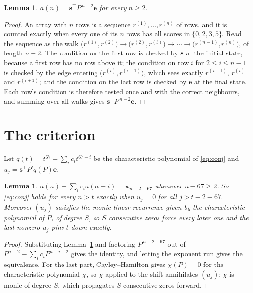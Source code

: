 \documentclass[11pt,a4paper]{article}
\theoremstyle{plain}
\newtheorem{lemma}[theorem]{Lemma}
\theoremstyle{definition}
\begin{document}
\begin{lemma}\label{lem:walk}
$a(n)=\mathbf{s}^{\!\top}P^{\,n-2}\mathbf{e}$ for every $n\ge2$.
\end{lemma}

\begin{proof}
An array with $n$ rows is a sequence $r^{(1)},\dots,r^{(n)}$ of rows, and it is counted
exactly when every one of its $n$ rows has all scores in $\{0,2,3,5\}$. Read the sequence as the
walk $\bigl(r^{(1)},r^{(2)}\bigr)\to\bigl(r^{(2)},r^{(3)}\bigr)\to\cdots\to
\bigl(r^{(n-1)},r^{(n)}\bigr)$, of length $n-2$. The condition on the first row is
checked by $\mathbf{s}$ at the initial state, because a first row has no row above it; the
condition on row $i$ for $2\le i\le n-1$ is checked by the edge entering
$\bigl(r^{(i)},r^{(i+1)}\bigr)$, which sees exactly $r^{(i-1)}$, $r^{(i)}$ and
$r^{(i+1)}$; and the condition on the last row is checked by $\mathbf{e}$ at the final
state. Each row's condition is therefore tested once and with the correct neighbours, and
summing over all walks gives $\mathbf{s}^{\!\top}P^{\,n-2}\mathbf{e}$.
\end{proof}

\section{The criterion}

Let $q(t)=t^{67}-\sum_i c_i t^{67-i}$ be the characteristic polynomial of
\eqref{eq:conj} and $u_j=\mathbf{s}^{\!\top}P^{j}q(P)\mathbf{e}$.

\begin{lemma}\label{lem:crit}
$a(n)-\sum_i c_i a(n-i)=u_{\,n-2-67}$ whenever $n-67\ge2$. So \eqref{eq:conj}
holds for every $n>t$ exactly when $u_j=0$ for all $j>t-2-67$. Moreover $(u_j)$
satisfies the monic linear recurrence given by the characteristic polynomial of $P$, of
degree $S$, so $S$ consecutive zeros force every later one and the last nonzero $u_j$ pins
$t$ down exactly.
\end{lemma}

\begin{proof}
Substituting Lemma~\ref{lem:walk} and factoring $P^{\,n-2-67}$ out of
$P^{n-2}-\sum_i c_i P^{n-i-2}$ gives the identity, and letting the exponent run gives the
equivalence. For the last part, Cayley--Hamilton gives $\chi(P)=0$ for the characteristic
polynomial $\chi$, so $\chi$ applied to the shift annihilates $(u_j)$; $\chi$ is monic of
degree $S$, which propagates $S$ consecutive zeros forward.
\end{proof}
\end{document}
